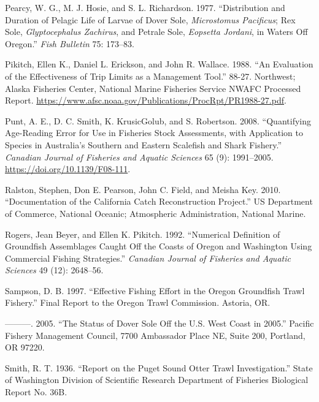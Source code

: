\documentclass[11pt,
  english,
  a4paper,
]{article}
\begin{document}
\begin{cslreferences}
\leavevmode\hypertarget{ref-pearcy_distribution_1977}{}%
Pearcy, W. G., M. J. Hosie, and S. L. Richardson. 1977. ``Distribution and Duration of Pelagic Life of Larvae of Dover Sole, \emph{Microstomus Pacificus}; Rex Sole, \emph{Glyptocephalus Zachirus}, and Petrale Sole, \emph{Eopsetta Jordani}, in Waters Off Oregon.'' \emph{Fish Bulletin} 75: 173--83.

\leavevmode\hypertarget{ref-pikitch_evaluation_1988}{}%
Pikitch, Ellen K., Daniel L. Erickson, and John R. Wallace. 1988. ``An Evaluation of the Effectiveness of Trip Limits as a Management Tool.'' 88-27. Northwest; Alaska Fisheries Center, National Marine Fisheries Service NWAFC Processed Report. \url{https://www.afsc.noaa.gov/Publications/ProcRpt/PR1988-27.pdf}.

\leavevmode\hypertarget{ref-punt_quantifying_2008}{}%
Punt, A. E., D. C. Smith, K. KrusicGolub, and S. Robertson. 2008. ``Quantifying Age-Reading Error for Use in Fisheries Stock Assessments, with Application to Species in Australia's Southern and Eastern Scalefish and Shark Fishery.'' \emph{Canadian Journal of Fisheries and Aquatic Sciences} 65 (9): 1991--2005. \url{https://doi.org/10.1139/F08-111}.

\leavevmode\hypertarget{ref-ralston_documentation_2010}{}%
Ralston, Stephen, Don E. Pearson, John C. Field, and Meisha Key. 2010. ``Documentation of the California Catch Reconstruction Project.'' US Department of Commerce, National Oceanic; Atmospheric Administration, National Marine.

\leavevmode\hypertarget{ref-rogers_numerical_1992}{}%
Rogers, Jean Beyer, and Ellen K. Pikitch. 1992. ``Numerical Definition of Groundfish Assemblages Caught Off the Coasts of Oregon and Washington Using Commercial Fishing Strategies.'' \emph{Canadian Journal of Fisheries and Aquatic Sciences} 49 (12): 2648--56.

\leavevmode\hypertarget{ref-sampson_effective_1997}{}%
Sampson, D. B. 1997. ``Effective Fishing Effort in the Oregon Groundfish Trawl Fishery.'' Final Report to the Oregon Trawl Commission. Astoria, OR.

\leavevmode\hypertarget{ref-sampson_status_2005}{}%
---------. 2005. ``The Status of Dover Sole Off the U.S. West Coast in 2005.'' Pacific Fishery Management Council, 7700 Ambassador Place NE, Suite 200, Portland, OR 97220.

\leavevmode\hypertarget{ref-smith_report_1936}{}%
Smith, R. T. 1936. ``Report on the Puget Sound Otter Trawl Investigation.'' State of Washington Division of Scientific Research Department of Fisheries Biological Report No. 36B.


\end{cslreferences}
\end{document}

